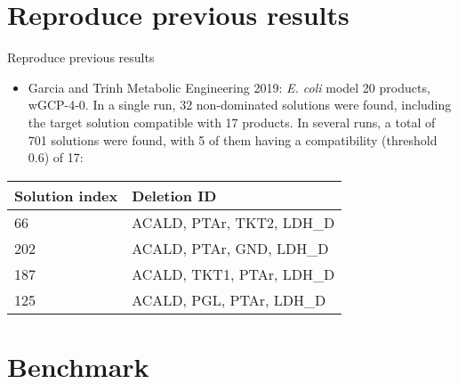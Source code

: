 \documentclass[8pt]{beamer}
\begin{document}
\section{Reproduce previous results}
    \begin{frame}{Reproduce previous results}
        \begin{itemize}
            \item Garcia and Trinh Metabolic Engineering 2019: \textit{E. coli} model 20 products, wGCP-4-0. In a single run, 32 non-dominated solutions were found, including the target solution compatible with 17 products. In several runs, a total of 701 solutions were found, with 5 of them having a compatibility (threshold 0.6) of 17:
        \end{itemize}

        \vspace{0.5cm}
        \centering
        \begin{tabular}{l|l}
            Solution index &	Deletion ID\\
            \hline
            66	& ACALD, PTAr, TKT2, LDH\_D \\
            202	& ACALD, PTAr, GND, LDH\_D \\
            187	& ACALD, TKT1, PTAr, LDH\_D\\
            125	& ACALD, PGL, PTAr, LDH\_D\\
        \end{tabular}

    \end{frame}

\section{Benchmark}
\end{document}
